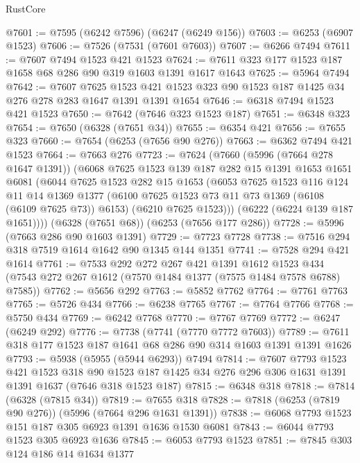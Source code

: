 \begin{lexlean}{RustCore}
\begin{coremodule}
@7601 := @7595 (@6242 @7596) (@6247 (@6249 @156))
@7603 := @6253 (@6907 @1523)
@7606 := @7526 (@7531 (@7601 @7603))
@7607 := @6266 @7494
@7611 := @7607 @7494 @1523 @421 @1523
@7624 := @7611 @323 @177 @1523 @187 @1658 @68 @286 @90 @319 @1603 @1391 @1617 @1643
@7625 := @5964 @7494
@7642 := @7607
    @7625
    @1523
    @421
    @1523
    @323
    @90
    @1523
    @187
    @1425
    @34
    @276
    @278
    @283
    @1647
    @1391
    @1391
    @1654
@7646 := @6318 @7494 @1523 @421 @1523
@7650 := @7642 (@7646 @323 @1523 @187)
@7651 := @6348 @323
@7654 := @7650 (@6328 (@7651 @34))
@7655 := @6354 @421
@7656 := @7655 @323
@7660 := @7654 (@6253 (@7656 @90 @276))
@7663 := @6362 @7494 @421 @1523
@7664 := @7663 @276
@7723 := @7624
    (@7660
      (@5996 (@7664 @278 @1647 @1391))
      (@6068
        @7625
        @1523
        @139
        @187
        @282
        @15
        @1391
        @1653
        @1651
        @6081
        (@6044
          @7625
          @1523
          @282
          @15
          @1653
          (@6053
            @7625
            @1523
            @116
            @124
            @11
            @14
            @1369
            @1377
            (@6100 @7625 @1523 @73 @11 @73 @1369 (@6108 (@6109 @7625 @73)) @6153)
            (@6210 @7625 @1523)))
        (@6222 (@6224 @139 @187 @1651))))
    (@6328 (@7651 @68))
    (@6253 (@7656 @177 @286))
@7728 := @5996 (@7663 @286 @90 @1603 @1391)
@7729 := @7723 @7728
@7738 := @7516 @294 @318 @7519 @1614 @1642 @90 @1345 @144 @1351
@7741 := @7528 @294 @421 @1614
@7761 := @7533
    @292
    @272
    @267
    @421
    @1391
    @1612
    @1523
    @434
    (@7543 @272 @267 @1612 (@7570 @1484 @1377 (@7575 @1484 @7578 @6788) @7585))
@7762 := @5656 @292
@7763 := @5852 @7762
@7764 := @7761 @7763
@7765 := @5726 @434
@7766 := @6238 @7765
@7767 := @7764 @7766
@7768 := @5750 @434
@7769 := @6242 @7768
@7770 := @7767 @7769
@7772 := @6247 (@6249 @292)
@7776 := @7738 (@7741 (@7770 @7772 @7603))
@7789 := @7611 @318 @177 @1523 @187 @1641 @68 @286 @90 @314 @1603 @1391 @1391 @1626
@7793 := @5938 (@5955 (@5944 @6293)) @7494
@7814 := @7607
    @7793
    @1523
    @421
    @1523
    @318
    @90
    @1523
    @187
    @1425
    @34
    @276
    @296
    @306
    @1631
    @1391
    @1391
    @1637
    (@7646 @318 @1523 @187)
@7815 := @6348 @318
@7818 := @7814 (@6328 (@7815 @34))
@7819 := @7655 @318
@7828 := @7818 (@6253 (@7819 @90 @276)) (@5996 (@7664 @296 @1631 @1391))
@7838 := @6068 @7793 @1523 @151 @187 @305 @6923 @1391 @1636 @1530 @6081
@7843 := @6044 @7793 @1523 @305 @6923 @1636
@7845 := @6053 @7793 @1523
@7851 := @7845 @303 @124 @186 @14 @1634 @1377

\end{coremodule}
\end{lexlean}

